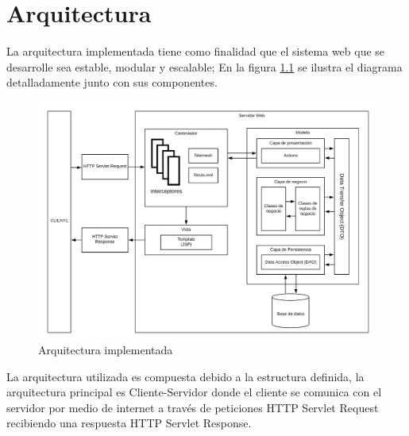 \chapter{Arquitectura} \label{cap:seis}

La arquitectura implementada tiene como finalidad que el sistema web que se desarrolle sea estable, modular y escalable; En la figura \ref{fig:arqui} se ilustra el diagrama  detalladamente junto con sus componentes.

\begin{figure}[H]
	\begin{center}
		\includegraphics[width=.75\textwidth]{images/arquitectura/DiagramaArquitecturaTesseract}
		\caption{Arquitectura implementada}
		\label{fig:arqui}
	\end{center}
\end{figure}

La arquitectura utilizada es compuesta debido a la estructura definida, la arquitectura principal es Cliente-Servidor donde el cliente se comunica con el servidor por medio de internet a través de peticiones HTTP Servlet Request recibiendo una respuesta HTTP Servlet Response.\\

